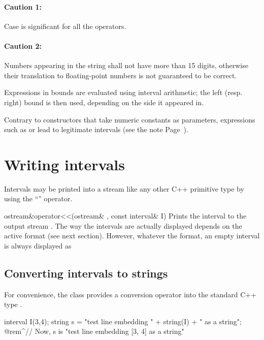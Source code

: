 \documentclass{manual}
\begin{document}
\paragraph*{Caution 1:} Case is significant for all the operators.

\paragraph*{Caution 2:} Numbers appearing in the string shall not have more than 
15 digits, otherwise their translation to floating-point numbers is not 
guaranteed to be correct.

Expressions in bounds are evaluated using interval arithmetic; the left (resp. right)
bound is then used, depending on the side it appeared in.

Contrary to constructors that take numeric constants as parameters, expressions such as  or  lead to legitimate intervals (see the note Page~\pageref{par:inf_inf_note}).

\section{Writing intervals}

Intervals may be printed into a stream like any other C++ primitive type
by using the ``\code{<{}<}'' operator.

\begin{deffun}{ostream\&}{operator<{}<}{(ostream\& , const interval\& I)}
Prints the interval  to the output stream . The way the intervals
are actually displayed depends on the active format (see next section).
However, whatever the format, an empty interval is always displayed as \code{[empty]}
%
%
\end{deffun}

\subsection{Converting intervals to strings}

For convenience, the  class provides a conversion operator
into the standard C++ type .
%

\begin{example}
  interval I(3,4);
  string s = "test line embedding " + string(I) + " as a string";
  @rem^// Now, s is "test line embedding [3, 4] as a string"~
\end{example}
\end{document}
